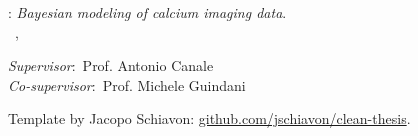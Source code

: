 \thispagestyle{empty}

\hfill

\vfill

\noindent\myName: \emph{Bayesian modeling of calcium imaging data}.\\
\textcopyright~\myLocation,~\myDate

\medskip
%
\noindent\textit{Supervisor}:~Prof. Antonio Canale \\
\noindent\textit{Co-supervisor}:~Prof. Michele Guindani \\

\medskip

\noindent Template by Jacopo Schiavon: \href{https://github.com/jschiavon/clean-thesis}{github.com/jschiavon/clean-thesis}.